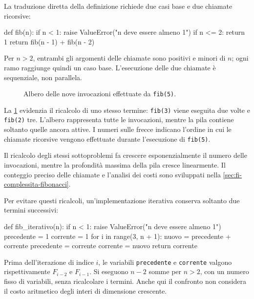 La traduzione diretta della definizione richiede due casi base e
due chiamate ricorsive:

\begin{unipdcode}[language=Python]
def fib(n):
    if n < 1:
        raise ValueError("n deve essere almeno 1")
    if n <= 2:
        return 1
    return fib(n - 1) + fib(n - 2)
\end{unipdcode}

Per \(n>2\), entrambi gli argomenti delle chiamate sono positivi e
minori di \(n\); ogni ramo raggiunge quindi un caso base.
L'esecuzione delle due chiamate è sequenziale, non parallela.

\begin{figure}[htbp]
  \centering
  
  \caption{Albero delle nove invocazioni effettuate da
  \texttt{fib(5)}.}
  \label{fig:fi-fibonacci-albero}
\end{figure}

La \cref{fig:fi-fibonacci-albero} evidenzia il ricalcolo di uno
stesso termine: \texttt{fib(3)} viene eseguita due volte e
\texttt{fib(2)} tre. L'albero rappresenta tutte le invocazioni,
mentre la pila contiene soltanto quelle ancora attive.
I numeri sulle frecce indicano l'ordine in cui le chiamate ricorsive
vengono effettuate durante l'esecuzione di \texttt{fib(5)}.

Il ricalcolo degli stessi sottoproblemi fa crescere esponenzialmente
il numero delle invocazioni, mentre la profondità massima della pila
cresce linearmente. Il conteggio preciso delle chiamate e l'analisi
dei costi sono sviluppati nella
\cref{sec:fi-complessita-fibonacci}.

\clearpage

Per evitare questi ricalcoli, un'implementazione iterativa conserva
soltanto due termini successivi:

\begin{unipdcode}[language=Python]
def fib_iterativo(n):
    if n < 1:
        raise ValueError("n deve essere almeno 1")
    precedente = 1
    corrente = 1
    for i in range(3, n + 1):
        nuovo = precedente + corrente
        precedente = corrente
        corrente = nuovo
    return corrente
\end{unipdcode}

Prima dell'iterazione di indice \(i\), le variabili
\texttt{precedente} e \texttt{corrente} valgono rispettivamente
\(F_{i-2}\) e \(F_{i-1}\). Si eseguono \(n-2\) somme per \(n>2\),
con un numero fisso di variabili, senza ricalcolare i termini.
Anche qui il confronto non considera il costo aritmetico degli interi
di dimensione crescente.

